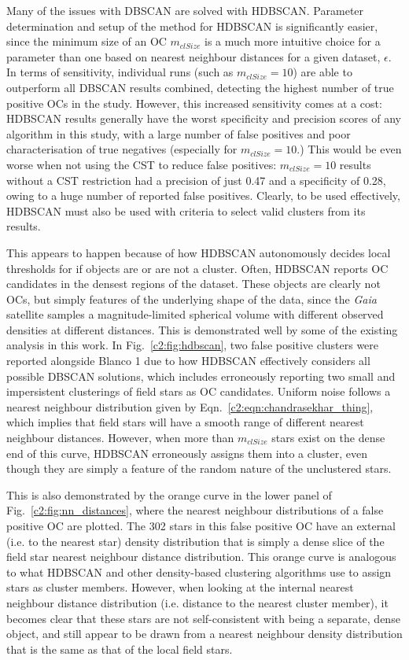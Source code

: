 Many of the issues with DBSCAN are solved with HDBSCAN. Parameter determination and setup of the method for HDBSCAN is significantly easier, since the minimum size of an OC $m_{clSize}$ is a much more intuitive choice for a parameter than one based on nearest neighbour distances for a given dataset, $\epsilon$. In terms of sensitivity, individual runs (such as $m_{clSize}=10$) are able to outperform all DBSCAN results combined, detecting the highest number of true positive OCs in the study. However, this increased sensitivity comes at a cost: HDBSCAN results generally have the worst specificity and precision scores of any algorithm in this study, with a large number of false positives and poor characterisation of true negatives (especially for $m_{clSize}=10$.) This would be even worse when not using the CST to reduce false positives: $m_{clSize}=10$ results without a CST restriction had a precision of just 0.47 and a specificity of 0.28, owing to a huge number of reported false positives. Clearly, to be used effectively, HDBSCAN must also be used with criteria to select valid clusters from its results.

This appears to happen because of how HDBSCAN autonomously decides local thresholds for if objects are or are not a cluster. Often, HDBSCAN reports OC candidates in the densest regions of the dataset. These objects are clearly not OCs, but simply features of the underlying shape of the data, since the \emph{Gaia} satellite samples a magnitude-limited spherical volume with different observed densities at different distances. This is demonstrated well by some of the existing analysis in this work. In Fig.~\ref{c2:fig:hdbscan}, two false positive clusters were reported alongside Blanco 1 due to how HDBSCAN effectively considers all possible DBSCAN solutions, which includes erroneously reporting two small and impersistent clusterings of field stars as OC candidates. Uniform noise follows a nearest neighbour distribution given by Eqn.~\ref{c2:eqn:chandrasekhar_thing}, which implies that field stars will have a smooth range of different nearest neighbour distances. However, when more than $m_{clSize}$ stars exist on the dense end of this curve, HDBSCAN erroneously assigns them into a cluster, even though they are simply a feature of the random nature of the unclustered stars.

This is also demonstrated by the orange curve in the lower panel of Fig.~\ref{c2:fig:nn_distances}, where the nearest neighbour distributions of a false positive OC are plotted. The 302 stars in this false positive OC have an external (i.e. to the nearest star) density distribution that is simply a dense slice of the field star nearest neighbour distance distribution. This orange curve is analogous to what HDBSCAN and other density-based clustering algorithms use to assign stars as cluster members. However, when looking at the internal nearest neighbour distance distribution (i.e. distance to the nearest cluster member), it becomes clear that these stars are not self-consistent with being a separate, dense object, and still appear to be drawn from a nearest neighbour density distribution that is the same as that of the local field stars.

